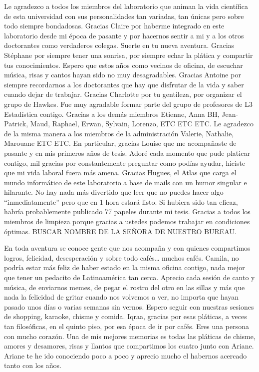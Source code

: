 Le agradezco a todos los miembros del laboratorio que animan la vida científica de esta universidad con sus personalidades tan variadas, tan únicas pero sobre todo siempre bondadosas. Gracias Claire por haberme integrado en este laboratorio desde mi época de pasante y por hacernos sentir a mi y a los otros doctorantes como verdaderos colegas. Suerte en tu nueva aventura. Gracias Stéphane por siempre tener una sonrisa, por siempre echar la plática y compartir tus conocimientos. Espero que estos años como vecinos de oficina, de escuchar música, risas y cantos hayan sido no muy desagradables. Gracias Antoine por siempre recordarnos a los doctorantes que hay que disfrutar de la vida y saber cuando dejar de trabajar. Gracias Charlotte por tu gentileza, por organizar el grupo de Hawkes. Fue muy agradable formar parte del grupo de profesores de L3 Estadística contigo. Gracias a los demás miembros Etienne, Anna BH, Jean-Patrick, Maud, Raphael, Erwan, Sylvain, Lorenzo, ETC ETC ETC. Le agradezco de la misma manera a los miembros de la administración Valerie,  Nathalie, Marouane ETC ETC. En particular, gracias Louise que me acompañaste de pasante y en mis primeros años de tesis. Adoré cada momento que pude platicar contigo, mil gracias por constantemente preguntar como podías ayudar, hiciste que mi vida laboral fuera más amena. Gracias Hugues, el Atlas que carga el mundo informático de este laboratorio a base de mails con un humor singular e hilarante. No hay nada más divertido que leer que no puedes hacer algo “inmediatamente” pero que en 1 hora estará listo. Si hubiera sido tan eficaz, habría probablemente publicado 77 papeles durante mi tesis. Gracias a todos los miembros de limpieza porque gracias a ustedes podemos trabajar en condiciones óptimas. BUSCAR NOMBRE DE LA SEÑORA DE NUESTRO BUREAU.


En toda aventura se conoce gente que nos acompaña y con quienes compartimos logros, felicidad, desesperación y sobre todo cafés… muchos cafés. Camila, no podría estar más feliz de haber estado en la misma oficina contigo, nada mejor que tener un pedacito de Latinoamérica tan cerca. Aprecio cada sesión de canto y música, de enviarnos memes, de pegar el rostro del otro en las sillas y más que nada la felicidad de gritar cuando nos volvemos a ver, no importa que hayan pasado unos días o varias semanas sin vernos. Espero seguir con nuestras sesiones de shopping, karaoke, chisme y comida.
Iqraa, gracias por esas pláticas, a veces tan filosóficas, en el quinto piso, por esa época de ir por cafés. Eres una persona con mucho corazón. Una de mis mejores memorias es todas las pláticas de chisme, amores y desamores, risas y llantos que compartimos los cuatro junto con Ariane. 
Ariane te he ido conociendo poco a poco y aprecio mucho el habernos acercado tanto con los años. 

